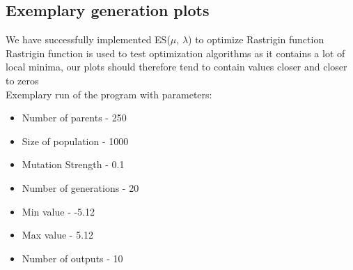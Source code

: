 \documentclass{article}[12pt]
\begin{document}
\subsection{Exemplary generation plots}
We have successfully implemented ES($\mu$, $\lambda$) to optimize Rastrigin function \\ 
Rastrigin function is used to test optimization algorithms as it contains a lot of local minima, our plots should therefore tend to contain values closer and closer to zeros \\ 
Exemplary run of the program with parameters:
\begin{itemize}
    \item Number of parents - 250
    \item Size of population - 1000
    \item Mutation Strength - 0.1
    \item Number of generations - 20
    \item Min value - -5.12
    \item Max value - 5.12
    \item Number of outputs - 10
\end{itemize}
\end{document}
